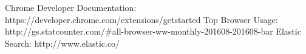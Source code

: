 \begin{thebibliography}{9}
	 Chrome Developer Documentation: https://developer.chrome.com/extensions/getstarted
	 Top Browser Usage: http://gs.statcounter.com/\#all-browser-ww-monthly-201608-201608-bar
	 Elastic Search: http://www.elastic.co/
\end{thebibliography}
